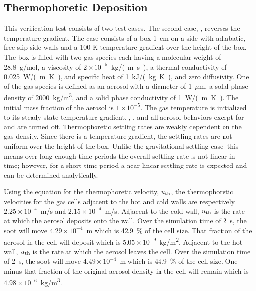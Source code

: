 \documentclass[11pt]{book}
\begin{document}
\subsection{Thermophoretic Deposition}
    \label{aerosol_thermophoretic_deposition}

This verification test consists of two test cases. The second case, , reverses the temperature gradient. The case consists of a box 1~cm on a side with adiabatic, free-slip side walls and a 100 K temperature gradient over the height of the box. The box is filled with two gas species each having a molecular weight of 28.8~g/mol, a viscosity of $2\times10^{-5}$~\unit{kg/(m.s)}, a thermal conductivity of 0.025~\unit{W/(m.K)}, and specific heat of 1~\unit{kJ/(kg.K)}, and zero diffusivity. One of the gas species is defined as an aerosol with a diameter of 1~$\mu$m, a solid phase density of 2000~\unit{kg/m^3}, and a solid phase conductivity of 1~\unit{W/(m.K)}. The initial mass fraction of the aerosol is $1\times10^{-5}$. The gas temperature is initialized to its steady-state temperature gradient. , , and all aerosol behaviors except for  and  are turned off. Thermophoretic settling rates are weakly dependent on the gas density. Since there is a temperature gradient, the settling rates are not uniform over the height of the box. Unlike the gravitational settling case, this means over long enough time periods the overall settling rate is not linear in time; however, for a short time period a near linear settling rate is expected and can be determined analytically.

Using the equation for the thermophoretic velocity, $u_{\rm th}$, the thermophoretic velocities for the gas cells adjacent to the hot and cold walls are respectively $2.25 \times 10^{-4}$~m/s and $2.15 \times 10^{-4}$~m/s. Adjacent to the cold wall, $u_{\rm th}$ is the rate at which the aerosol deposits onto the wall. Over the simulation time of 2~s, the soot will move $4.29 \times 10^{-4}$~m which is 42.9~\% of the cell size. That fraction of the aerosol in the cell will deposit which is $5.05 \times 10^{-9}$~\unit{kg/m^2}. Adjacent to the hot wall, $u_{\rm th}$ is the rate at which the aerosol leaves the cell. Over the simulation time of 2~s, the soot will move $4.49 \times 10^{-4}$~m which is 44.9~\% of the cell size. One minus that fraction of the original aerosol density in the cell will remain which is $4.98 \times 10^{-6}$~\unit{kg/m^3}.
\end{document}
